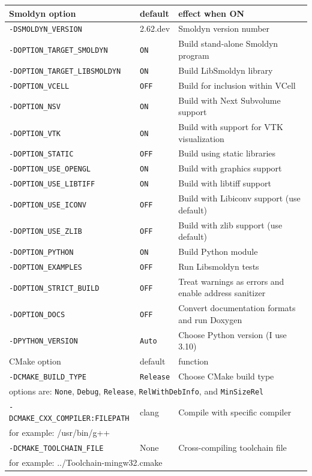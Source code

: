 \documentclass {scrbook}
\newcommand {\ttt} {\texttt}
\begin{document}
\begin{longtable}[c]{lll}
Smoldyn option & default & effect when ON\\
\hline
\ttt{-DSMOLDYN\_VERSION} & 2.62.dev & Smoldyn version number\\
\ttt{-DOPTION\_TARGET\_SMOLDYN} & \ttt{ON} & Build stand-alone Smoldyn program\\
\ttt{-DOPTION\_TARGET\_LIBSMOLDYN} & \ttt{ON} & Build LibSmoldyn library\\
\ttt{-DOPTION\_VCELL} & \ttt{OFF} & Build for inclusion within VCell\\
\ttt{-DOPTION\_NSV} & \ttt{ON} & Build with Next Subvolume support\\
\ttt{-DOPTION\_VTK} & \ttt{ON} & Build with support for VTK visualization\\
\ttt{-DOPTION\_STATIC} & \ttt{OFF} & Build using static libraries\\
\ttt{-DOPTION\_USE\_OPENGL} & \ttt{ON} & Build with graphics support\\
\ttt{-DOPTION\_USE\_LIBTIFF} & \ttt{ON} & Build with libtiff support\\
\ttt{-DOPTION\_USE\_ICONV} & \ttt{OFF} & Build with Libiconv support (use default)\\
\ttt{-DOPTION\_USE\_ZLIB} & \ttt{OFF} & Build with zlib support (use default)\\
\ttt{-DOPTION\_PYTHON} & \ttt{ON} & Build Python module\\
\ttt{-DOPTION\_EXAMPLES} & \ttt{OFF} & Run Libsmoldyn tests\\
\ttt{-DOPTION\_STRICT\_BUILD} & \ttt{OFF} & Treat warnings as errors and enable address sanitizer\\
\ttt{-DOPTION\_DOCS} & \ttt{OFF} & Convert documentation formats and run Doxygen\\
\ttt{-DPYTHON\_VERSION} & \ttt{Auto} & Choose Python version (I use 3.10)\\
\hline
CMake option & default & function\\
\hline
\ttt{-DCMAKE\_BUILD\_TYPE} & \ttt{Release} & Choose CMake build type\\
\multicolumn{3}{l}{\hspace{0.3in}options are: \ttt{None}, \ttt{Debug}, \ttt{Release}, \ttt{RelWithDebInfo}, and \ttt{MinSizeRel}}\\
\ttt{-DCMAKE\_CXX\_COMPILER:FILEPATH} & clang & Compile with specific compiler\\
\multicolumn{3}{l}{\hspace{0.3in}for example: /usr/bin/g++}\\
\ttt{-DCMAKE\_TOOLCHAIN\_FILE} & None & Cross-compiling toolchain file \\
\multicolumn{3}{l}{\hspace{0.3in}for example: ../Toolchain-mingw32.cmake}\\
\end{longtable}
\end{document}

